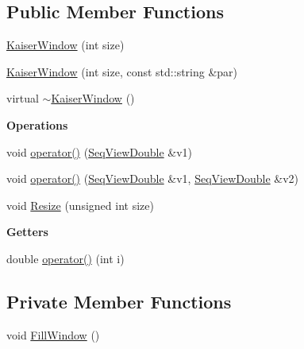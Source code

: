 \subsection*{Public Member Functions}
\begin{DoxyCompactItemize}
\item 
\hyperlink{classtsa_1_1_kaiser_window_a1435f80a21b198c05d60be076fa152b1}{Kaiser\+Window} (int size)
\item 
\hyperlink{classtsa_1_1_kaiser_window_ae1de2ef14d0c6b80161d0456502b4753}{Kaiser\+Window} (int size, const std\+::string \&par)
\item 
virtual \hyperlink{classtsa_1_1_kaiser_window_a98965a07384b404238a53bf9d66e8c77}{$\sim$\+Kaiser\+Window} ()
\end{DoxyCompactItemize}
\begin{Indent}\textbf{ Operations}\par
\begin{DoxyCompactItemize}
\item 
void \hyperlink{classtsa_1_1_kaiser_window_a02d18a272d16d54fa4f7c9e8b227356e}{operator()} (\hyperlink{namespacetsa_ac599574bcc094eda25613724b8f3ca9e}{Seq\+View\+Double} \&v1)
\item 
void \hyperlink{classtsa_1_1_kaiser_window_a94b99f1c961eadad783e44ccce9629e7}{operator()} (\hyperlink{namespacetsa_ac599574bcc094eda25613724b8f3ca9e}{Seq\+View\+Double} \&v1, \hyperlink{namespacetsa_ac599574bcc094eda25613724b8f3ca9e}{Seq\+View\+Double} \&v2)
\item 
void \hyperlink{classtsa_1_1_kaiser_window_ae573c5ab979c3292d10feddc5180b6b4}{Resize} (unsigned int size)
\end{DoxyCompactItemize}
\end{Indent}
\begin{Indent}\textbf{ Getters}\par
\begin{DoxyCompactItemize}
\item 
double \hyperlink{classtsa_1_1_kaiser_window_a12dbee6e0639e3f8b7bc1191c46d9798}{operator()} (int i)
\end{DoxyCompactItemize}
\end{Indent}
\subsection*{Private Member Functions}
\begin{DoxyCompactItemize}
\item 
void \hyperlink{classtsa_1_1_kaiser_window_a4799ed39290a058eea9d44df73f764ea}{Fill\+Window} ()
\end{DoxyCompactItemize}
